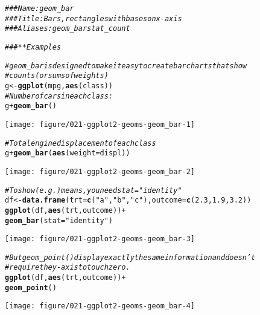 \documentclass[a4paper,titlepage]{tufte-handout}\usepackage[]{graphicx}\usepackage[]{color}
\makeatletter
\def\maxwidth{ %
  \ifdim\Gin@nat@width>\linewidth
    \linewidth
  \else
    \Gin@nat@width
  \fi
}
\newcommand{\hlnum}[1]{\textcolor[rgb]{0.686,0.059,0.569}{#1}}%
\newcommand{\hlstr}[1]{\textcolor[rgb]{0.192,0.494,0.8}{#1}}%
\newcommand{\hlcom}[1]{\textcolor[rgb]{0.678,0.584,0.686}{\textit{#1}}}%
\newcommand{\hlopt}[1]{\textcolor[rgb]{0,0,0}{#1}}%
\newcommand{\hlstd}[1]{\textcolor[rgb]{0.345,0.345,0.345}{#1}}%
\newcommand{\hlkwb}[1]{\textcolor[rgb]{0.69,0.353,0.396}{#1}}%
\newcommand{\hlkwc}[1]{\textcolor[rgb]{0.333,0.667,0.333}{#1}}%
\newcommand{\hlkwd}[1]{\textcolor[rgb]{0.737,0.353,0.396}{\textbf{#1}}}%
\newenvironment{kframe}{%
 \def\at@end@of@kframe{}%
 \ifinner\ifhmode%
  \def\at@end@of@kframe{\end{minipage}}%
  \begin{minipage}{\columnwidth}%
 \fi\fi%
 \def\FrameCommand##1{\hskip\@totalleftmargin \hskip-\fboxsep
 \colorbox{shadecolor}{##1}\hskip-\fboxsep
     \hskip-\linewidth \hskip-\@totalleftmargin \hskip\columnwidth}%
 \MakeFramed {\advance\hsize-\width
   \@totalleftmargin\z@ \linewidth\hsize
   \@setminipage}}%
 {\par\unskip\endMakeFramed%
 \at@end@of@kframe}
\newenvironment{knitrout}{}{} %
\makeatother
\begin{document}
\begin{knitrout}
\color{fgcolor}\begin{kframe}
\begin{alltt}
\hlcom{### Name: geom_bar}
\hlcom{### Title: Bars, rectangles with bases on x-axis}
\hlcom{### Aliases: geom_bar stat_count}

\hlcom{### ** Examples}

\hlcom{# geom_bar is designed to make it easy to create bar charts that show}
\hlcom{# counts (or sums of weights)}
\hlstd{g} \hlkwb{<-} \hlkwd{ggplot}\hlstd{(mpg,} \hlkwd{aes}\hlstd{(class))}
\hlcom{# Number of cars in each class:}
\hlstd{g} \hlopt{+} \hlkwd{geom_bar}\hlstd{()}
\end{alltt}
\end{kframe}
\texttt{[image: figure/021-ggplot2-geoms-geom\_bar-1]} 
\begin{kframe}\begin{alltt}
\hlcom{# Total engine displacement of each class}
\hlstd{g} \hlopt{+} \hlkwd{geom_bar}\hlstd{(}\hlkwd{aes}\hlstd{(}\hlkwc{weight} \hlstd{= displ))}
\end{alltt}
\end{kframe}
\texttt{[image: figure/021-ggplot2-geoms-geom\_bar-2]} 
\begin{kframe}\begin{alltt}
\hlcom{# To show (e.g.) means, you need stat = "identity"}
\hlstd{df} \hlkwb{<-} \hlkwd{data.frame}\hlstd{(}\hlkwc{trt} \hlstd{=} \hlkwd{c}\hlstd{(}\hlstr{"a"}\hlstd{,} \hlstr{"b"}\hlstd{,} \hlstr{"c"}\hlstd{),} \hlkwc{outcome} \hlstd{=} \hlkwd{c}\hlstd{(}\hlnum{2.3}\hlstd{,} \hlnum{1.9}\hlstd{,} \hlnum{3.2}\hlstd{))}
\hlkwd{ggplot}\hlstd{(df,} \hlkwd{aes}\hlstd{(trt, outcome))} \hlopt{+}
  \hlkwd{geom_bar}\hlstd{(}\hlkwc{stat} \hlstd{=} \hlstr{"identity"}\hlstd{)}
\end{alltt}
\end{kframe}
\texttt{[image: figure/021-ggplot2-geoms-geom\_bar-3]} 
\begin{kframe}\begin{alltt}
\hlcom{# But geom_point() display exactly the same information and doesn't}
\hlcom{# require the y-axis to touch zero.}
\hlkwd{ggplot}\hlstd{(df,} \hlkwd{aes}\hlstd{(trt, outcome))} \hlopt{+}
  \hlkwd{geom_point}\hlstd{()}
\end{alltt}
\end{kframe}
\texttt{[image: figure/021-ggplot2-geoms-geom\_bar-4]} 

\end{knitrout}
\end{document}
